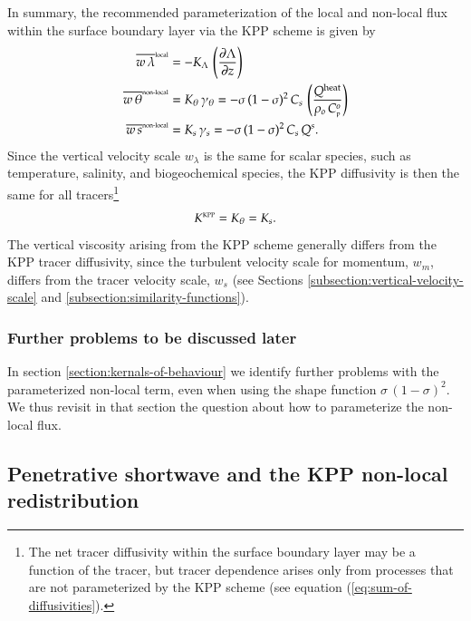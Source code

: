 In summary, the recommended parameterization of the local and
non-local flux within the surface boundary layer via the KPP scheme is
given by
\begin{subequations}
\begin{align}
\overline{w \, \lambda}^{\mbox{\tiny local}} &= -K_{\Lambda}  \, \left( \frac{\partial \Lambda}{\partial z} \right)
 \\
\overline{w \, \theta}^{\mbox{\tiny non-local}} &= K_{\theta}  \, \gamma_{\theta} = 
 - \sigma \, (1-\sigma)^{2} \, C_{s} \, \left( \frac{ Q^{\mbox{\scriptsize heat}}}{ \rho_{o}  \, C_{\mbox{\tiny p}}^{o} } \right)
\label{eq:non-local-flux-kpp-param-temp-simple}
\\
\overline{w \, s}^{\mbox{\tiny non-local}} &= K_{s}  \, \gamma_{s}  = 
 -\sigma \, (1-\sigma)^{2}  \, C_{s} \,  Q^{s}.
\label{eq:non-local-flux-kpp-param-scalar-simple}
\end{align}
\end{subequations}
Since the vertical velocity scale $w_{\lambda}$ is the same for scalar
species, such as temperature, salinity, and biogeochemical species,
the KPP diffusivity is then the same for all tracers\footnote{The net
  tracer diffusivity within the surface boundary layer may be a
  function of the tracer, but tracer dependence arises only from
  processes that are not parameterized by the KPP scheme (see equation
  (\ref{eq:sum-of-diffusivities}).}
\begin{equation}
  K^{\mbox{\tiny KPP}}  = K_{\theta} = K_{s}.
\end{equation} 
The vertical viscosity arising from the KPP scheme generally differs
from the KPP tracer diffusivity, since the turbulent velocity scale
for momentum, $w_{m}$, differs from the tracer velocity scale, $w_{s}$
(see Sections \ref{subsection:vertical-velocity-scale} and
\ref{subsection:similarity-functions}).


\subsubsection{Further problems to be discussed later}

In section \ref{section:kernals-of-behaviour} we identify further
problems with the parameterized non-local term, even when using the
shape function $\sigma \, (1-\sigma)^{2}$.  We thus revisit in that
section the question about how to parameterize the non-local flux.


\subsection{Penetrative shortwave and the KPP non-local redistribution}
\label{subsection:penetrative-radiation-and-kpp-nonlocal}

